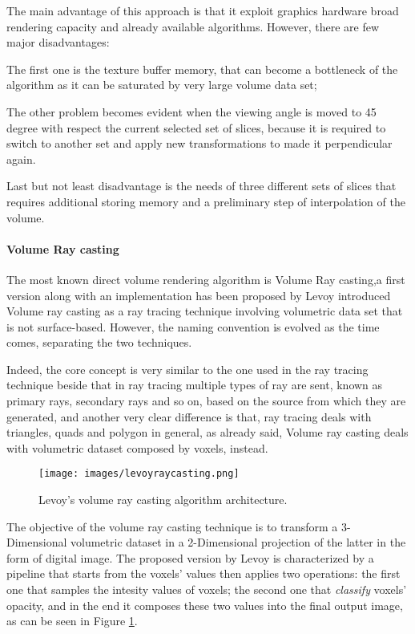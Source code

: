\documentclass[12pt,a4paper]{extarticle}
\newcommand{\linespace}{\vspace{8pt}}
\begin{document}
The main advantage of this approach is that it exploit graphics hardware broad rendering capacity and already available algorithms. However, there are few major disadvantages: 

The first one is the texture buffer memory, that can become a bottleneck of the algorithm as it can be saturated by very large volume data set; 

The other problem becomes evident when the viewing angle is moved to 45 degree with respect the current selected set of slices, because it is required to switch to another set and apply new transformations to made it perpendicular again.


Last but not least disadvantage is the needs of three different sets of slices that requires additional storing memory and a preliminary step of interpolation of the volume.

\paragraph{Volume Ray casting}
The most known direct volume rendering algorithm is Volume Ray casting,a first version along with an implementation has been proposed by %
Levoy introduced Volume ray casting as a ray tracing technique involving volumetric data set that is not surface-based. However, the naming convention is evolved as the time comes, separating the two techniques.
\linespace

Indeed, the core concept is very similar to the one used in the ray tracing technique beside that in ray tracing multiple types of ray are sent, known as primary rays, secondary rays and so on, based on the source from which they are generated, and another very clear difference is that, ray tracing deals with triangles, quads and polygon in general, as already said, Volume ray casting deals with volumetric dataset composed by voxels, instead.


\begin{figure}[hbtp]
\centering
\texttt{[image: images/levoyraycasting.png]}
\caption{Levoy's volume ray casting algorithm architecture.}
\label{fig:levoyraycasting}
\end{figure}

The objective of the volume ray casting technique is to transform a 3-Dimensional volumetric dataset in a 2-Dimensional projection of the latter in the form of digital image. The proposed version by Levoy is characterized by a pipeline that starts from the voxels' values then applies two operations: the first one that samples the intesity values of voxels; the second one that \textit{classify} voxels' opacity, and in the end it composes these two values into the final output image, as can be seen in Figure \ref{fig:levoyraycasting}.
\linespace
\end{document}
